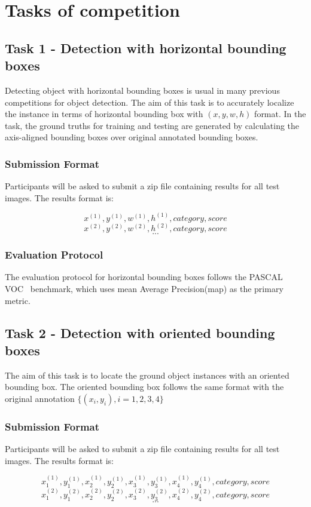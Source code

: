 \documentclass[a4paper]{article}
\begin{document}
\section{Tasks of competition}
\subsection{Task 1 - Detection with horizontal bounding boxes }
Detecting object with horizontal bounding boxes is usual in many previous competitions for object detection. The aim of this task is to accurately localize the instance in terms of horizontal bounding box with $(x, y, w, h)$ format. In the task, the ground truths for training and testing are generated by calculating the axis-aligned bounding boxes over original annotated bounding boxes.
\subsubsection*{Submission Format}
Participants will be asked to submit a zip file containing results for all test images. The results format is:

$$x^{(1)}, y^{(1)}, w^{(1)}, h^{(1)},  category, score$$
$$x^{(2)}, y^{(2)}, w^{(2)}, h^{(2)},  category, score$$
$$...$$
\subsubsection*{Evaluation Protocol}
The evaluation protocol for horizontal bounding boxes follows the PASCAL VOC~\cite{PASCALVOC} benchmark, which uses mean Average Precision(map) as the primary metric.

\subsection{Task 2 - Detection with oriented bounding boxes}
The aim of this task is to locate the ground object instances with an oriented bounding box. The oriented bounding box follows the same format with the original annotation $\{(x_i, y_i), i = 1, 2, 3, 4\}$

\subsubsection*{Submission Format}
Participants will be asked to submit a zip file containing results for all test images. The results format is:

$$x_1^{(1)}, y_1^{(1)}, x_2^{(1)}, y_2^{(1)}, x_3^{(1)}, y_3^{(1)}, x_4^{(1)}, y_4^{(1)}, category, score$$
$$x_1^{(2)}, y_1^{(2)}, x_2^{(2)}, y_2^{(2)}, x_3^{(2)}, y_3^{(2)}, x_4^{(2)}, y_4^{(2)}, category, score$$
$$...$$
\end{document}
